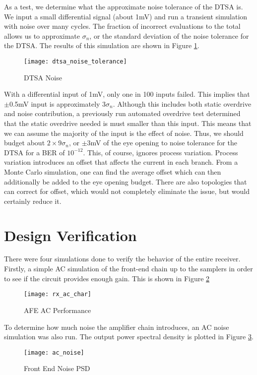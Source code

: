 As a test, we determine what the approximate noise tolerance of the DTSA is. We input a small differential signal (about 1mV) and run a transient simulation with noise over many cycles. The fraction of incorrect evaluations to the total allows us to approximate $\sigma_n$, or the standard deviation of the noise tolerance for the DTSA. The results of this simulation are shown in Figure \ref{fig:dtsa_noise}.
\begin{figure}[h]
\centering
\texttt{[image: dtsa\_noise\_tolerance]}
\caption{DTSA Noise}
\label{fig:dtsa_noise}
\end{figure}
With a differential input of 1mV, only one in 100 inputs failed. This implies that $\pm$0.5mV input is approximately $3\sigma_n$. Although this includes both static overdrive and noise contribution, a previously run automated overdrive test determined that the static overdrive needed is must smaller than this input. This means that we can assume the majority of the input is the effect of noise. Thus, we should budget about $2\times 9\sigma_n$, or $\pm$3mV of the eye opening to noise tolerance for the DTSA for a BER of $10^{-12}$. This, of course, ignores process variation. Process variation introduces an offset that affects the current in each branch. From a Monte Carlo simulation, one can find the average offset which can then additionally be added to the eye opening budget. There are also topologies that can correct for offset, which would not completely eliminate the issue, but would certainly reduce it.
\clearpage
\section{Design Verification}
There were four simulations done to verify the behavior of the entire receiver. Firstly, a simple AC simulation of the front-end chain up to the samplers in order to see if the circuit provides enough gain. This is shown in Figure \ref{fig:afe_ac}
\begin{figure}[h]
\centering
\texttt{[image: rx\_ac\_char]}
\caption{AFE AC Performance}
\label{fig:afe_ac}
\end{figure}
\clearpage
To determine how much noise the amplifier chain introduces, an AC noise simulation was also run. The output power spectral density is plotted in Figure \ref{fig:psd}.
\begin{figure}[h]
\centering
\texttt{[image: ac\_noise]}
\caption{Front End Noise PSD}
\label{fig:psd}
\end{figure}


